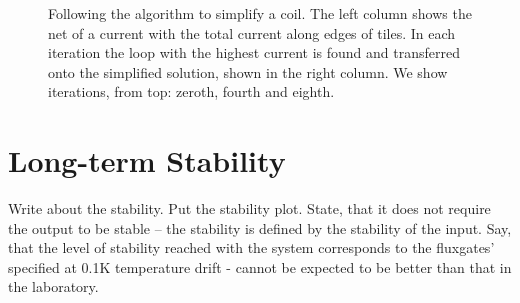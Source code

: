 \begin{figure}
  \centering
  \quad
  \caption{Following the algorithm to simplify a coil. The left column shows the net of a current with the total current along edges of tiles. In each iteration the loop with the highest current is found and transferred onto the simplified solution, shown in the right column. We show iterations, from top: zeroth, fourth and eighth.}
  \label{fig:prototype_compensation}
\end{figure}


\section{Long-term Stability}
Write about the stability. Put the stability plot. State, that it does not require the output to be stable -- the stability is defined by the stability of the input. Say, that the level of stability reached with the system corresponds to the fluxgates' specified at 0.1K temperature drift - cannot be expected to be better than that in the laboratory.

